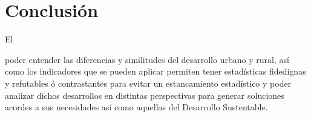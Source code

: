 \documentclass[stu, 12pt, letterpaper, donotrepeattitle, floatsintext, natbib]{apa7}
\begin{document}
\section*{Conclusión}
El \begin{justifying}
    poder entender las diferencias y similitudes del desarrollo urbano y rural, así como los indicadores que se pueden aplicar
    permiten tener estadísticas fidedignas y refutables ó contrastantes para evitar un estancamiento estadístico y poder analizar dichos desarrollos
    en distintas perspectivas para generar soluciones acordes a sus necesidades así como aquellas del Desarrollo Sustentable.\par
\end{justifying}

\newpage
\setcounter{secnumdepth}{0} %
\renewcommand\refname{\textbf{Referencias}}
\end{document}
